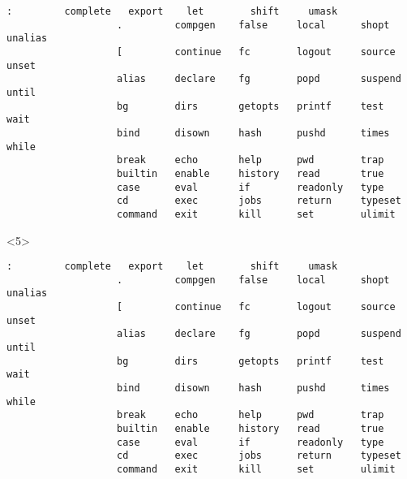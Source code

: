 \begin{frame}
\begin{overlayarea}{\textwidth}{0.7\textheight}
\begin{onlyenv}
\begin{onlyenv}
\begin{lstlisting}[style=MyBash, numbers=none, keywordstyle=\color{builtins-color},]
                   :         complete   export    let        shift     umask  
                   .         compgen    false     local      shopt     unalias
                   [         continue   fc        logout     source    unset  
                   alias     declare    fg        popd       suspend   until  
                   bg        dirs       getopts   printf     test      wait   
                   bind      disown     hash      pushd      times     while  
                   break     echo       help      pwd        trap      
                   builtin   enable     history   read       true      
                   case      eval       if        readonly   type      
                   cd        exec       jobs      return     typeset   
                   command   exit       kill      set        ulimit    
                \end{lstlisting}
            \end{onlyenv}
            \begin{onlyenv}<5>
                \begin{lstlisting}[style=MyBash, numbers=none, deleteemph={[5]:,.,[,alias, bg, bind, break, case, cd, complete, compgen, continue, declare, dirs, disown, echo, eval, exec, exit, export,false, fg, help, if, jobs, kill, let, local, popd, printf, pushd, pwd, read, readonly, return, set, shift, shopt, source, test, trap, true, unalias, unset, until, wait, while}, emph={[7]:,.,[,alias, bg, bind, break, case, cd, complete, compgen, continue, declare, dirs, disown, echo, eval, exec, exit, export,false, fg, help, if, jobs, kill, let, local, popd, printf, pushd, pwd, read, readonly, return, set, shift, shopt, source, test, trap, true, unalias, unset, until, wait, while}, emphstyle={[7]\color{PP}}]
                   :         complete   export    let        shift     umask  
                   .         compgen    false     local      shopt     unalias
                   [         continue   fc        logout     source    unset  
                   alias     declare    fg        popd       suspend   until  
                   bg        dirs       getopts   printf     test      wait   
                   bind      disown     hash      pushd      times     while  
                   break     echo       help      pwd        trap      
                   builtin   enable     history   read       true      
                   case      eval       if        readonly   type      
                   cd        exec       jobs      return     typeset   
                   command   exit       kill      set        ulimit    

\end{lstlisting}
\end{onlyenv}
\end{onlyenv}
\end{overlayarea}
\end{frame}
